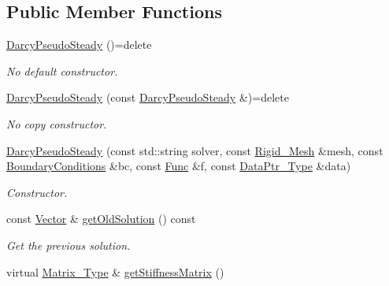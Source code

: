 \subsection*{Public Member Functions}
\begin{DoxyCompactItemize}
\item 
\hyperlink{classFVCode3D_1_1DarcyPseudoSteady_3_01QRMatrix_00_01QRFracture_00_01MatrixType_00_01Implicit_01_4_aad4e1fea5cdbfbed51dee790b2b23957}{Darcy\+Pseudo\+Steady} ()=delete
\begin{DoxyCompactList}\small\item\em No default constructor. \end{DoxyCompactList}\item 
\hyperlink{classFVCode3D_1_1DarcyPseudoSteady_3_01QRMatrix_00_01QRFracture_00_01MatrixType_00_01Implicit_01_4_a1613e3f299d27364488b47806ffc03d1}{Darcy\+Pseudo\+Steady} (const \hyperlink{classFVCode3D_1_1DarcyPseudoSteady}{Darcy\+Pseudo\+Steady} \&)=delete
\begin{DoxyCompactList}\small\item\em No copy constructor. \end{DoxyCompactList}\item 
\hyperlink{classFVCode3D_1_1DarcyPseudoSteady_3_01QRMatrix_00_01QRFracture_00_01MatrixType_00_01Implicit_01_4_a94b61786396af1ffb9fffdd2e02e5081}{Darcy\+Pseudo\+Steady} (const std\+::string solver, const \hyperlink{classFVCode3D_1_1Rigid__Mesh}{Rigid\+\_\+\+Mesh} \&mesh, const \hyperlink{classFVCode3D_1_1BoundaryConditions}{Boundary\+Conditions} \&bc, const \hyperlink{namespaceFVCode3D_a38fa3b2520ad364d2c3d56ea5077826a}{Func} \&f, const \hyperlink{namespaceFVCode3D_a3d19a370a98afe491a9e17a646a9c56f}{Data\+Ptr\+\_\+\+Type} \&data)
\begin{DoxyCompactList}\small\item\em Constructor. \end{DoxyCompactList}\item 
const \hyperlink{namespaceFVCode3D_a16ccf345652402bccd1a5d2e6782526c}{Vector} \& \hyperlink{classFVCode3D_1_1DarcyPseudoSteady_3_01QRMatrix_00_01QRFracture_00_01MatrixType_00_01Implicit_01_4_a3b2a09e4850a569c88bd3673aba02c46}{get\+Old\+Solution} () const 
\begin{DoxyCompactList}\small\item\em Get the previous solution. \end{DoxyCompactList}\item 
virtual \hyperlink{classFVCode3D_1_1DarcyPseudoSteady_3_01QRMatrix_00_01QRFracture_00_01MatrixType_00_01Implicit_01_4_a0c4c09b192d518545409c84da0ba6f16}{Matrix\+\_\+\+Type} \& \hyperlink{classFVCode3D_1_1DarcyPseudoSteady_3_01QRMatrix_00_01QRFracture_00_01MatrixType_00_01Implicit_01_4_a17cfb03a42e7e4fb4166c0f4438bf8fe}{get\+Stiffness\+Matrix} ()

\end{DoxyCompactItemize}
